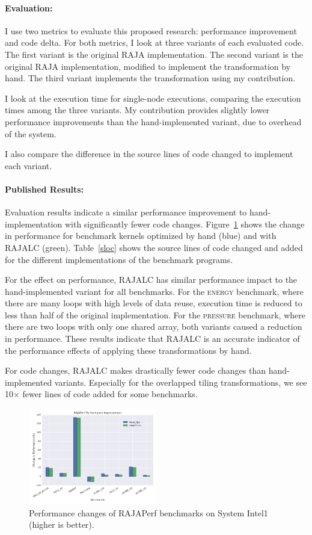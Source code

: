 \documentclass{article}
\begin{document}
\paragraph{Evaluation:}

I use two metrics to evaluate this proposed research: performance improvement and code delta. 
For both metrics, I look at three variants of each evaluated code.
The first variant is the original RAJA implementation. 
The second variant is the original RAJA implementation, modified to implement the transformation by hand.
The third variant implements the transformation using my contribution.

I look at the execution time for single-node executions, comparing the execution times among the three variants. My contribution provides slightly lower performance improvements than the hand-implemented variant, due to overhead of the system.

I also compare the difference in the source lines of code changed to implement each variant.

\paragraph{Published Results:}
Evaluation results indicate a similar performance improvement to hand-implementation with significantly fewer code changes.
Figure~\ref{RAJAPerfPerf} shows the change in performance for benchmark kernels optimized by hand (blue) and with RAJALC (green). 
Table~\ref{sloc} shows the source lines of code changed and added for the different implementations of the benchmark programs.

For the effect on performance, RAJALC has similar performance impact to the hand-implemented variant for all benchmarks. 
For the \textsc{energy} benchmark, where there are many loops with high levels of data reuse, execution time is reduced to less than half of the original implementation.
For the \textsc{pressure} benchmark, where there are two loops with only one shared array, both variants caused a reduction in performance.
These results indicate that RAJALC is an accurate indicator of the performance effects of applying these transformations by hand.

For code changes, RAJALC makes drastically fewer code changes than hand-implemented variants. 
Especially for the overlapped tiling transformations, we see  10$\times$ fewer lines of code added for some benchmarks.
\begin{figure}
\includegraphics[width=0.5\textwidth]{RAJALC-perf-system-1.png}
\caption{Performance changes of RAJAPerf benchmarks on System Intel1 (higher is better).}
\label{RAJAPerfPerf}
\end{figure}
\end{document}

